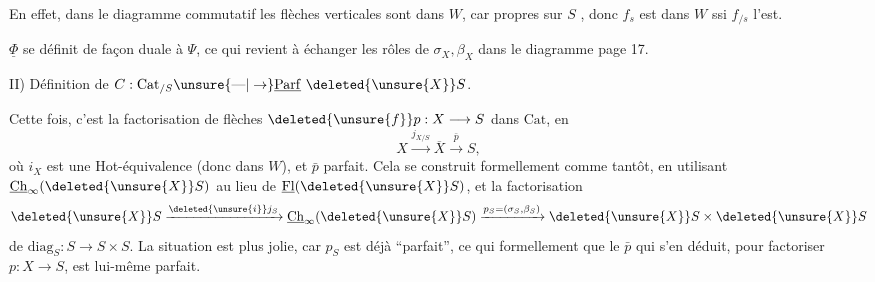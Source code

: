 En effet, dans le diagramme commutatif
les flèches verticales sont dans $W$, car   propres sur $S$ , donc $f_s$ est dans $W$ ssi $f_{/s}$ l'est.

$\underline{\Phi}$ se définit de façon duale à $\Psi$, ce qui revient à échanger les rôles de $\sigma_X,\beta_X$ dans le diagramme page 17.

II) Définition de  $C:\mathrm{Cat}_{/S}\unsure{\text{---}|\to}\underline{\mathrm{Parf}}\ \deleted{\unsure{X}}S$.

Cette fois, c'est la factorisation de  flèches $\deleted{\unsure{f}}p:X\longrightarrow S$ dans $\mathrm{Cat}$, en
\[ X\xrightarrow{j_{X/S}}\overline{X}\xrightarrow{\bar p} S, \]
où $i_X$ est une Hot-équivalence (donc dans $W$), et $\bar p$ parfait. Cela se construit formellement comme tantôt, en utilisant $\underline{\mathrm{Ch}}_\infty(\deleted{\unsure{X}}S)$ au lieu de $\underline{\mathrm{Fl}}(\deleted{\unsure{X}}S)$, et la factorisation
\[ \deleted{\unsure{X}}S\xrightarrow{\deleted{\unsure{i}}j_S}\underline{\mathrm{Ch}}_\infty(\deleted{\unsure{X}}S)\xrightarrow{p_S=(\sigma_S,\beta_S)}\deleted{\unsure{X}}S\times\deleted{\unsure{X}}S \]
de $\mathrm{diag}_S:S\longrightarrow S\times S$. La situation est plus jolie, car $p_S$ est déjà ``parfait'', ce qui  formellement que le $\bar p$ qui s'en déduit, pour factoriser $p:X\longrightarrow S$, est lui-même parfait.


